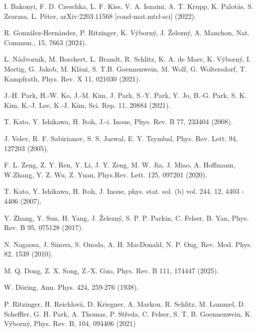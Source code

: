 \documentclass[prb,showpacs,amsmath,amssymb,superscriptaddress,twocolumn,floatfix]{revtex4-1}
\begin{document}
\begin{thebibliography}{99}
 I. Bakonyi, F. D. Czeschka, L. F. Kiss, V. A. Isnaini, A. T. Krupp, K. Palot\'as, S. Zsurzsa, L. P\'eter, arXiv:2203.11568 [cond-mat.mtrl-sci] (2022). %

 R. Gonz\'alez-Hern\'andez, P. Ritzinger, K. V\'yborn\'y, J. \v{Z}elezn\'y, A. Manchon, Nat. Commun., 15, 7663 (2024).%

 L. N\'{a}dvorn\'{i}k, M. Borchert, L. Brandt, R. Schlitz, K. A. de Mare, K. V\'{y}born\'{y}, I. Mertig, G. Jakob, M. {Kl\"{a}ui}, S. T.B. Goennenwein, M. Wolf, G. Woltersdorf, T. Kampfrath, Phys. Rev. X 11, 021030 (2021). %

 J.‑H. Park, H.‑W. Ko, J.‑M. Kim, J. Park, S.‑Y. Park, Y. Jo, B.‑G. Park, S. K. Kim, K.‑J. Lee, K.‑J. Kim, Sci. Rep. 11, 20884 (2021).%

 T. Kato, Y. Ishikawa, H. Itoh, J.-i. Inoue, Phys. Rev. B 77, 233404 (2008). %

 J. Velev, R. F. Sabirianov, S. S. Jaswal, E. Y. Tsymbal, Phys. Rev. Lett. 94, 127203 (2005). %

 F. L. Zeng, Z. Y. Ren, Y. Li, J. Y. Zeng, M. W. Jia, J. Miao, A. Hoffmann, W.Zhang, Y. Z. Wu, Z. Yuan, Phys.Rev. Lett. 125, 097201 (2020). %

 T. Kato, Y. Ishikawa, H. Itoh, J. Inoue, phys. stat. sol. (b) vol. 244, 12, 4403 - 4406 (2007). %

 Y. Zhang, Y. Sun, H. Yang, J. \v{Z}elezn\'y, S. P. P. Parkin, C. Felser, B. Yan, Phys. Rev. B 95, 075128 (2017). %

 N. Nagaosa, J. Sinova, S. Onoda, A. H. MacDonald, N. P. Ong, Rev. Mod. Phys. 82, 1539 (2010). %

 M. Q. Dong, Z. X. Song, Z.-X. Guo,
Phys. Rev. B 111, 174447 (2025).

 W. D\"oring, Ann. Phys. 424, 259-276
(1938). %
  
 P. Ritzinger, H. Reichlov\'a, D. Kriegner, A. Markou, R. Schlitz, M. Lammel, D. Scheffler, G. H. Park, A. Thomas, P. St\v{r}eda, C. Felser, S. T. B. Goennenwein, K. V\'yborn\'y, Phys. Rev. B, 104, 094406 (2021)


\end{thebibliography}
\end{document}
